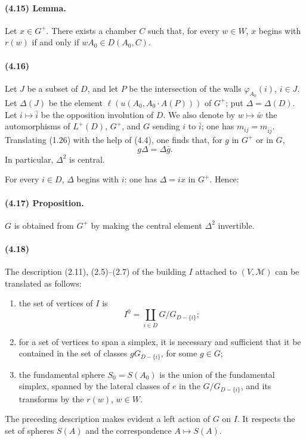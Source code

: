 \documentclass[10pt]{article}
\begin{document}
\paragraph{(4.15) Lemma.} Let \(x\in G^+\). There exists a chamber \(C\) such that, for every \(w\in W\), \(x\) begins with \(r(w)\) if and only if \(wA_0\in D(A_0,C)\).

\paragraph{(4.16)} Let \(J\) be a subset of \(D\), and let \(P\) be the intersection of the walls \(\varphi_{A_0}(i)\), \(i\in J\). Let \(\Delta(J)\) be the element \(\ell(u(A_0,A_0\cdot A(P)))\) of \(G^+\); put \(\Delta=\Delta(D)\). Let \(i\mapsto\bar i\) be the opposition involution of \(D\). We also denote by \(w\mapsto\bar w\) the automorphisms of \(L^+(D)\), \(G^+\), and \(G\) sending \(i\) to \(\bar i\); one has \(m_{ij}=m_{\bar i\bar j}\). Translating (1.26) with the help of (4.4), one finds that, for \(g\) in \(G^+\) or in \(G\),
\[
\tag{4.16.1}
g\Delta=\Delta\bar g.
\]
In particular, \(\Delta^2\) is central.

For every \(i\in D\), \(\Delta\) begins with \(i\): one has \(\Delta=ix\) in \(G^+\). Hence:

\paragraph{(4.17) Proposition.} \(G\) is obtained from \(G^+\) by making the central element \(\Delta^2\) invertible.

\paragraph{(4.18)} The description (2.11), (2.5)--(2.7) of the building \(I\) attached to \((V,\mathcal M)\) can be translated as follows:
\begin{enumerate}[label=\alph*)]
\item the set of vertices of \(I\) is
\[
I^0=\coprod_{i\in D}G/G_{D-\{i\}};
\]
\item for a set of vertices to span a simplex, it is necessary and sufficient that it be contained in the set of classes \(gG_{D-\{i\}}\), for some \(g\in G\);
\item the fundamental sphere \(S_0=S(A_0)\) is the union of the fundamental simplex, spanned by the lateral classes of \(e\) in the \(G/G_{D-\{i\}}\), and its transforms by the \(r(w)\), \(w\in W\).
\end{enumerate}
The preceding description makes evident a left action of \(G\) on \(I\). It respects the set of spheres \(S(A)\) and the correspondence \(A\mapsto S(A)\).
\end{document}
